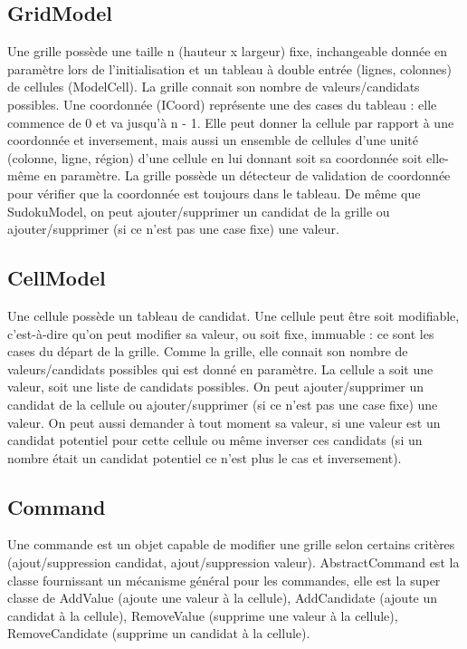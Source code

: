 \subsection{GridModel}
Une grille possède une taille n (hauteur x largeur) fixe, inchangeable donnée en paramètre lors de l'initialisation et
un tableau à double entrée (lignes, colonnes) de cellules (ModelCell).
La grille connait son nombre de valeurs/candidats possibles.
Une coordonnée (ICoord) représente une des cases du tableau : elle commence de 0 et va jusqu'à n - 1.
Elle peut donner la cellule par rapport à une coordonnée et inversement, mais aussi un ensemble de cellules d'une
unité (colonne, ligne, région) d'une cellule en lui donnant soit sa coordonnée soit elle-même en paramètre.
La grille possède un détecteur de validation de coordonnée pour vérifier que la coordonnée est toujours dans le tableau. 
De même que SudokuModel, on peut ajouter/supprimer un candidat de la grille ou ajouter/supprimer (si ce n'est pas une 
case fixe) une valeur.

\subsection{CellModel}
Une cellule possède un tableau de candidat.
Une cellule peut être soit modifiable, c'est-à-dire qu'on peut modifier sa valeur, ou soit fixe, immuable : 
ce sont les cases du départ de la grille. 
Comme la grille, elle connait son nombre de valeurs/candidats possibles qui est donné en paramètre.
La cellule a soit une valeur, soit une liste de candidats possibles. 
On peut ajouter/supprimer un candidat de la cellule ou ajouter/supprimer (si ce 
n'est pas une case fixe) une valeur. On peut aussi demander à tout moment sa valeur, si une valeur est un candidat
potentiel pour cette cellule ou même inverser ces candidats (si un nombre était un candidat potentiel ce n'est plus
le cas et inversement).

\subsection{Command}
Une commande est un objet capable de modifier une grille selon certains critères (ajout/suppression candidat, ajout/suppression valeur).
AbstractCommand est la classe fournissant un mécanisme général pour les commandes, elle est la super classe de 
AddValue (ajoute une valeur à la cellule), AddCandidate (ajoute un candidat à la cellule),
RemoveValue (supprime une valeur à la cellule), RemoveCandidate (supprime un candidat à la cellule).

